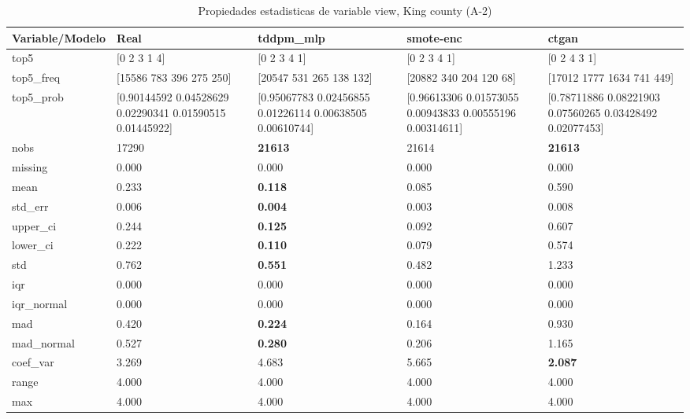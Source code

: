 \begin{table}[H]
\centering
\fontsize{8}{14}\selectfont
\caption{Propiedades  estadisticas de variable view, King county (A-2)}
\label{table-stats-king county-a-2-view}
\begin{tabular}{|l|m{10em}|m{10em}|m{10em}|m{10em}|}
\hline
 \rowcolor[gray]{0.8}
Variable/Modelo & Real & tddpm\_mlp & smote-enc & ctgan \\
\hline top5 & [0 2 3 1 4] & [0 2 3 4 1] & [0 2 3 4 1] & [0 2 4 3 1] \\
\hline top5\_freq & [15586   783   396   275   250] & [20547   531   265   138   132] & [20882   340   204   120    68] & [17012  1777  1634   741   449] \\
\hline top5\_prob & [0.90144592 0.04528629 0.02290341 0.01590515 0.01445922] & [0.95067783 0.02456855 0.01226114 0.00638505 0.00610744] & [0.96613306 0.01573055 0.00943833 0.00555196 0.00314611] & [0.78711886 0.08221903 0.07560265 0.03428492 0.02077453] \\
\hline nobs & 17290 & \bfseries 21613 & \cellcolor[rgb]{0.9, 0.54, 0.52} 21614 & \bfseries 21613 \\
\hline missing & 0.000 & 0.000 & 0.000 & 0.000 \\
\hline mean & 0.233 & \bfseries 0.118 & 0.085 & \cellcolor[rgb]{0.9, 0.54, 0.52} 0.590 \\
\hline std\_err & 0.006 & \bfseries 0.004 & 0.003 & \cellcolor[rgb]{0.9, 0.54, 0.52} 0.008 \\
\hline upper\_ci & 0.244 & \bfseries 0.125 & 0.092 & \cellcolor[rgb]{0.9, 0.54, 0.52} 0.607 \\
\hline lower\_ci & 0.222 & \bfseries 0.110 & 0.079 & \cellcolor[rgb]{0.9, 0.54, 0.52} 0.574 \\
\hline std & 0.762 & \bfseries 0.551 & 0.482 & \cellcolor[rgb]{0.9, 0.54, 0.52} 1.233 \\
\hline iqr & 0.000 & 0.000 & 0.000 & 0.000 \\
\hline iqr\_normal & 0.000 & 0.000 & 0.000 & 0.000 \\
\hline mad & 0.420 & \bfseries 0.224 & 0.164 & \cellcolor[rgb]{0.9, 0.54, 0.52} 0.930 \\
\hline mad\_normal & 0.527 & \bfseries 0.280 & 0.206 & \cellcolor[rgb]{0.9, 0.54, 0.52} 1.165 \\
\hline coef\_var & 3.269 & 4.683 & \cellcolor[rgb]{0.9, 0.54, 0.52} 5.665 & \bfseries 2.087 \\
\hline range & 4.000 & 4.000 & 4.000 & 4.000 \\
\hline max & 4.000 & 4.000 & 4.000 & 4.000 \\

\end{tabular}
\end{table}
